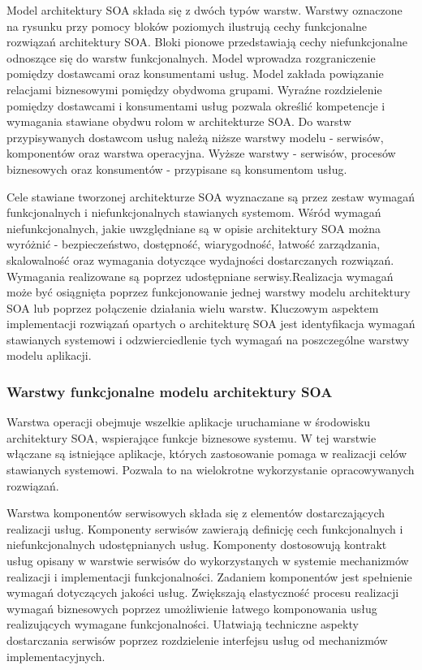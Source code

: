 		Model architektury SOA składa się z dwóch typów warstw. Warstwy oznaczone na rysunku przy pomocy bloków poziomych ilustrują cechy funkcjonalne rozwiązań architektury SOA. Bloki pionowe przedstawiają cechy niefunkcjonalne odnoszące się do warstw funkcjonalnych. Model wprowadza rozgraniczenie pomiędzy dostawcami oraz konsumentami usług. Model zakłada powiązanie relacjami biznesowymi pomiędzy obydwoma grupami. Wyraźne rozdzielenie pomiędzy dostawcami i konsumentami usług pozwala określić kompetencje i wymagania stawiane obydwu rolom w architekturze SOA. Do warstw przypisywanych dostawcom usług należą niższe warstwy modelu - serwisów, komponentów oraz warstwa operacyjna. Wyższe warstwy - serwisów, procesów biznesowych oraz konsumentów - przypisane są konsumentom usług. 

		Cele stawiane tworzonej architekturze SOA wyznaczane są przez zestaw wymagań funkcjonalnych i niefunkcjonalnych stawianych systemom. Wśród wymagań niefunkcjonalnych, jakie uwzględniane są w opisie architektury SOA można wyróżnić - bezpieczeństwo, dostępność, wiarygodność, łatwość zarządzania, skalowalność oraz wymagania dotyczące wydajności dostarczanych rozwiązań. Wymagania realizowane są poprzez udostępniane serwisy.Realizacja wymagań może być osiągnięta poprzez funkcjonowanie jednej warstwy modelu architektury SOA lub poprzez połączenie działania wielu warstw. Kluczowym aspektem implementacji rozwiązań opartych o architekturę SOA jest identyfikacja wymagań stawianych systemowi i odzwierciedlenie tych wymagań na poszczególne warstwy modelu aplikacji. 

		\subsubsection{Warstwy funkcjonalne modelu architektury SOA}


			Warstwa operacji obejmuje wszelkie aplikacje uruchamiane w środowisku architektury SOA, wspierające funkcje biznesowe systemu. W tej warstwie włączane są istniejące aplikacje, których zastosowanie pomaga w realizacji celów stawianych systemowi. Pozwala to na wielokrotne wykorzystanie opracowywanych rozwiązań\cite{Arsanjani07}. 

			Warstwa komponentów serwisowych składa się z elementów dostarczających realizacji usług. Komponenty serwisów zawierają definicję cech funkcjonalnych i niefunkcjonalnych udostępnianych usług. Komponenty dostosowują kontrakt usług opisany w warstwie serwisów do wykorzystanych w systemie mechanizmów realizacji i implementacji funkcjonalności. Zadaniem komponentów jest spełnienie wymagań dotyczących jakości usług. Zwiększają elastyczność procesu realizacji wymagań biznesowych poprzez umożliwienie łatwego komponowania usług realizujących wymagane funkcjonalności. Ułatwiają techniczne aspekty dostarczania serwisów poprzez rozdzielenie interfejsu usług od mechanizmów implementacyjnych.


